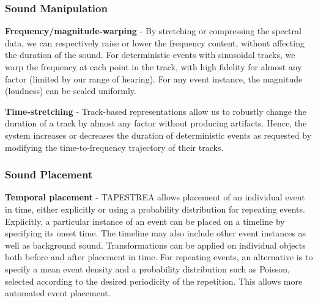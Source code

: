 \documentclass{acmsiggraph}               %
\begin{document}
\subsubsection{Sound Manipulation}

\textbf{Frequency/magnitude-warping} - By stretching or compressing the spectral
data, we can respectively raise or lower the frequency content, without 
affecting the duration of the sound.  For deterministic events with sinusoidal tracks, 
we warp the frequency at each point in the track, with high fidelity for almost any factor 
(limited by our range of hearing).  
For any event instance, the magnitude (loudness) can be scaled uniformly.

\textbf{Time-stretching} - Track-based representations allow us to 
robustly change the duration of a track by almost any factor without 
producing artifacts. Hence, the system increases or decreases the 
duration of deterministic events as requested by modifying the time-to-frequency trajectory of their tracks.


\subsubsection{Sound Placement}

\textbf{Temporal placement} -  TAPESTREA allows placement of an individual event in time, either explicitly or using 
a probability distribution for repeating events.  
Explicitly, a particular instance of an event can be placed on a timeline by specifying its onset time. The timeline 
may also include other event instances as well as background sound. Transformations can be applied on individual 
objects both before and after placement in time. 
For repeating events, an alternative is to specify a mean event density and a probability distribution 
such as Poisson, selected according to the desired periodicity of the repetition. This allows more automated 
event placement. 
\end{document}
